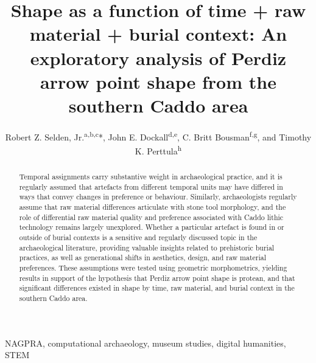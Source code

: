 \documentclass[review]{elsarticle}
\begin{document}
\begin{frontmatter}

\title{Shape as a function of time + raw material + burial context: An exploratory analysis of Perdiz arrow point shape from the southern Caddo area}

\author{Robert Z. Selden, Jr.\textsuperscript{a,b,c}*, John E. Dockall\textsuperscript{d,e}, C. Britt Bousman\textsuperscript{f,g}, and Timothy K. Perttula\textsuperscript{h}}
\address[1]{Heritage Research Center, Stephen F. Austin State University, US}
\address[2]{Cultural Heritage Department, Jean Monnet University, FR}
\address[3]{ORCID ID \href{http://orcid.org/0000-0002-1789-8449}{0000-0002-1789-8449}}
\address[4]{Cox|McClain Environmental Consulting, Inc., US}
\address[5]{ORCID ID \href{http://orcid.org/0000-0002-0940-7144}{0000-0002-0940-7144}}
\address[6]{Department of Anthropology, Texas State University, US}
\address[7]{ORCID ID \href{http://orcid.org/0000-0002-1645-8302}{0000-0002-1645-8302}}
\address[8]{Archeological \& Environmental Consultants, LLC, US}

\begin{abstract}
Temporal assignments carry substantive weight in archaeological practice, and it is regularly assumed that artefacts from different temporal units may have differed in ways that convey changes in preference or behaviour. Similarly, archaeologists regularly assume that raw material differences articulate with stone tool morphology, and the role of differential raw material quality and preference associated with Caddo lithic technology remains largely unexplored. Whether a particular artefact is found in or outside of burial contexts is a sensitive and regularly discussed topic in the archaeological literature, providing valuable insights related to prehistoric burial practices, as well as generational shifts in aesthetics, design, and raw material preferences. These assumptions were tested using geometric morphometrics, yielding results in support of the hypothesis that Perdiz arrow point shape is protean, and that significant differences existed in shape by time, raw material, and burial context in the southern Caddo area.
\end{abstract}

\begin{keyword}
NAGPRA, computational archaeology, museum studies, digital humanities, STEM
\end{keyword}

\end{frontmatter}
\end{document}
